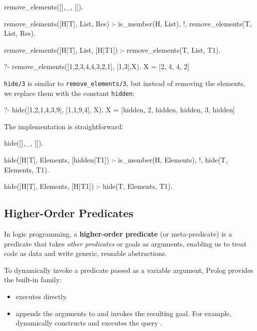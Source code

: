 \begin{codeblock}
remove_elements([],_, []).

remove_elements([H|T], List, Res) :-
    is_member(H, List), !,
    remove_elements(T, List, Res).

remove_elements([H|T], List, [H|T1]) :-
    remove_elements(T, List, T1).
\end{codeblock}

\begin{codeblock}
?- remove_elements([1,2,3,4,4,3,2,1], [1,3],X).
X = [2, 4, 4, 2]
\end{codeblock}

\texttt{hide/3} is similar to \texttt{remove\_elements/3}, but instead of removing the elements, we replace them with the constant \texttt{hidden}:

\begin{codeblock}
?- hide([1,2,1,4,3,9], [1,1,9,4], X).
X = [hidden, 2, hidden, hidden, 3, hidden]
\end{codeblock}

The implementation is straightforward:

\begin{codeblock}
hide([],_, []).

hide([H|T], Elements, [hidden|T1]) :-
    is_member(H, Elements), !,
    hide(T, Elements, T1).

hide([H|T], Elements, [H|T1]) :-
    hide(T, Elements, T1).
\end{codeblock}

\subsection{Higher-Order Predicates}
In logic programming, a \textbf{higher-order predicate} (or meta-predicate) is a predicate that takes \textit{other predicates} or goals as arguments, enabling us to treat code as data and write generic, reusable abstractions.

To dynamically invoke a predicate passed as a variable argument, Prolog provides the built-in  family:
\begin{itemize}
    \item {} executes  directly.
    \item {} appends the arguments to  and invokes the resulting goal. For example,  dynamically constructs and executes the query .
\end{itemize}


